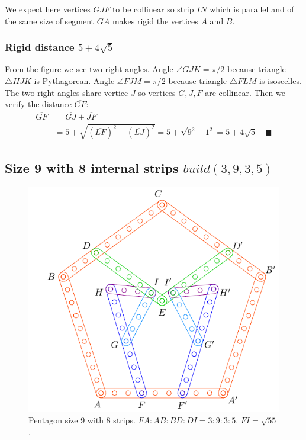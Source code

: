 \documentclass[11pt]{article}
\begin{document}
We expect here vertices $GJF$ to be collinear so strip $\overline{IN}$ which is parallel and of the same size of segment $\overline{GA}$ makes rigid the vertices $A$ and $B$.

\subsubsection{Rigid distance $5 + 4\sqrt5$}

From the figure we see two right angles. Angle $\angle{GJK} = \pi/2$ because triangle $\triangle{HJK}$  is Pythagorean. Angle $\angle{FJM} = \pi/2$ because triangle $\triangle{FLM}$ is isoscelles. The two right angles share vertice $J$ so vertices $G,J,F$ are collinear. Then we verify the distance $\overline{GF}$:
\begin{align}
\overline{GF} &= \overline{GJ} + \overline{JF} \nonumber\\
 &= 5 + \sqrt{(\overline{LF})^2 - (\overline{LJ})^2} 
 = 5 + \sqrt{9^2-1^2} = 5 + 4\sqrt5 \quad \blacksquare
\end{align}

\subsection{Size 9 with 8 internal strips $build(3,9,3,5)$}

\begin{figure}[H]
 \centering
 \includegraphics[scale=0.95]{9/penta9-8a}
 \caption{Pentagon size 9 with 8 strips. $\overline{FA}:\overline{AB}:\overline{BD}:\overline{DI} = 3:9:3:5$. $\overline{FI} = \sqrt{55}$.}
 \label{fig:penta9-8a}
\end{figure}
\end{document}
